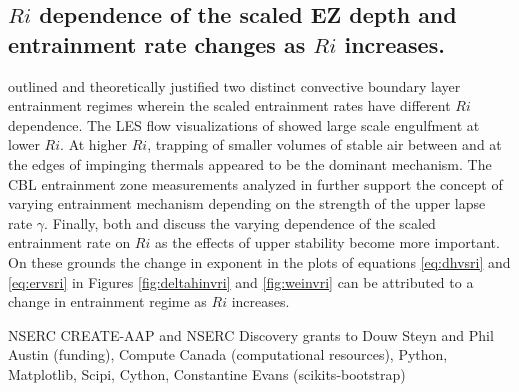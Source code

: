 \subsection{$Ri$ dependence of the scaled EZ depth and entrainment rate changes as $Ri$ increases.}

\cite{Turner86} outlined and theoretically justified two distinct convective boundary layer entrainment regimes wherein the scaled entrainment rates have different $Ri$ dependence. The LES flow visualizations of \cite{SullMoengStev} showed large scale engulfment at lower $Ri$.  At higher $Ri$, trapping of smaller volumes of stable air between and at the edges of impinging thermals appeared to be the dominant mechanism. The CBL entrainment zone measurements analyzed in \cite{Traum11} further support the concept of varying entrainment mechanism depending on the strength of the upper lapse rate $\gamma$.  Finally, both \cite{FedConzMir04} and \cite{GarciaMellado} discuss the varying dependence of the scaled entrainment rate on $Ri$ as the effects of upper stability become more important.  On these grounds the change in exponent in the plots of equations \ref{eq:dhvsri} and \ref{eq:ervsri} in Figures \ref{fig:deltahinvri} and \ref{fig:weinvri} can be attributed to a change in entrainment regime as $Ri$ increases.   



\begin{acknowledgements}
NSERC CREATE-AAP and NSERC Discovery grants to Douw Steyn and Phil Austin (funding), Compute Canada (computational resources), Python, Matplotlib, Scipi, Cython, Constantine Evans (scikits-bootstrap) 
\end{acknowledgements}








